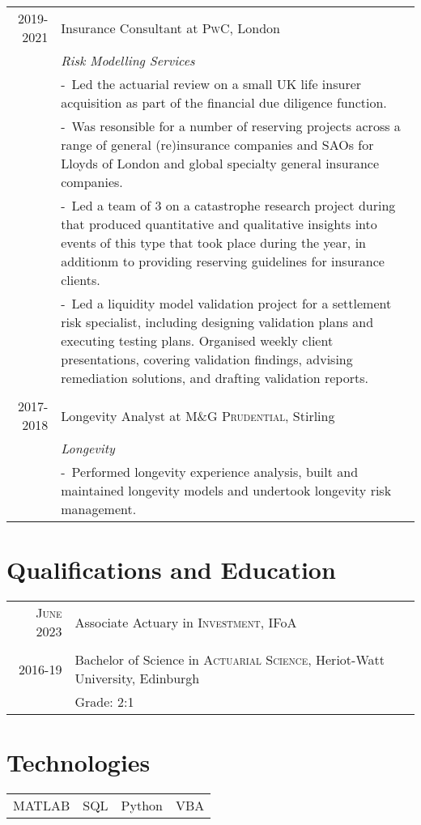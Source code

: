 \documentclass[a4paper,10pt]{article}
\newcommand{\blankline}{\multicolumn{1}{c}{}\\}
\newcommand{\projectitem}{\footnotesize-~\ignorespaces}
\begin{document}
\begin{tabularx}{\textwidth}{@{}r|>{\raggedright\arraybackslash}X@{}}
  \textsc{2019-2021} & Insurance Consultant at \textsc{PwC}, London \\
 & \emph{Risk Modelling Services}\\
 & \projectitem Led the actuarial review on a small UK life insurer acquisition as part of the financial due diligence function. \\
 & \projectitem Was resonsible for a number of reserving projects across a range of general (re)insurance companies and SAOs for Lloyds of London and global specialty general insurance companies.\\
  & \projectitem Led a team of 3 on a catastrophe research project during that produced quantitative and qualitative insights into events of this type that took place during the year, in additionm to providing reserving guidelines for insurance clients.\\
  & \projectitem Led a liquidity model validation project for a settlement risk specialist, including designing validation plans and executing testing plans. Organised weekly client presentations, covering validation findings, advising remediation solutions, and drafting validation reports.\\
  \blankline

  \textsc{2017-2018} & Longevity Analyst at \textsc{M\&G Prudential}, Stirling \\
 & \emph{Longevity}\\
 & \projectitem Performed longevity experience analysis, built and maintained longevity models and undertook longevity risk management.\\
\end{tabularx}

\section{Qualifications and Education}

\begin{tabular}{rl}	
\textsc{June 2023} & Associate Actuary in \textsc{Investment}, IFoA\\
\blankline
\textsc{2016-19}& Bachelor of Science in \textsc{Actuarial Science}, Heriot-Watt University, Edinburgh\\
&Grade: 2:1
\end{tabular}

\section{Technologies}
\begin{tabular}{l|l|l|l}	
MATLAB & SQL & Python & VBA
\end{tabular}
\end{document}
